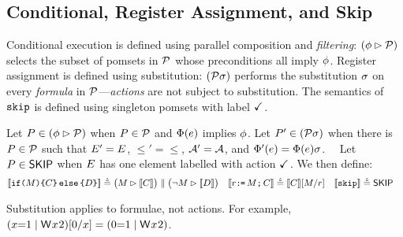 \subsection{Conditional, Register Assignment, and Skip}
Conditional execution is defined using parallel composition and
\emph{filtering}: $(\aForm \guard \aPSS)$ selects the subset of pomsets in
$\aPSS$ whose preconditions all imply $\aForm$.  Register assignment is
defined using substitution: $(\aPSS\aSub)$ performs the substitution $\aSub$
on every \emph{formula} in $\aPSS$---\emph{actions} are not subject to
substitution.  The semantics of $\SKIP$ is defined using singleton pomsets
with label $\DSTOP$.
\begin{definition}
    Let $\aPS\in(\aForm \guard \aPSS)$ when $\aPS\in\aPSS$ and 
    $\labelingForm(\aEv)$ implies $\aForm$.
    Let $\aPS'\in(\aPSS\aSub)$ when there is
    $\aPS\in\aPSS$ such that $\Event' = \Event$, ${\le'} = {\le}$,
    $\labelingAct' = \labelingAct$, and
    $\labelingForm'(\aEv) = \labelingForm(\aEv)\aSub$.
  \ \ Let $\aPS\in\stopPS$ when $\Event$ has one element labelled with action
  $\DSTOP$\!\!.
  We then define:
\begin{align*}
  \sem[\aThrd]{\IF{\aExp} \THEN \aCmd \ELSE \bCmd \FI} & \eqdef
  \bigl(\aExp \guard \sem[\aThrd]{\aCmd}\bigr) \parallel \bigl(\lnot\aExp \guard \sem[\aThrd]{\bCmd}\bigr) 
  &
  \sem[\aThrd]{\aReg\GETS\aExp\SEMI \aCmd} & \eqdef
  \sem[\aThrd]{\aCmd}[\aExp/\aReg] 
  &  
  \sem[\aThrd]{\SKIP} & \eqdef
  \stopPS
\end{align*}
\end{definition}
Substitution applies to formulae, not actions.  For example,
$(x{=}1\mid\DW{x}{2})[0/x]=(0{=}1\mid\DW{x}{2})$. %

